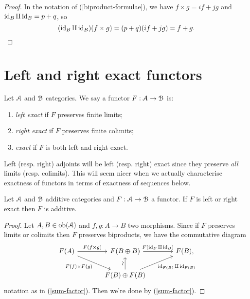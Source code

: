 \begin{proof}
  In the notation of (\ref{biproduct-formulae}), we have $f \times g =
  if + jg$ and $\operatorname{id}_B \amalg \operatorname{id}_B = p + q$, so
  \[
  (\operatorname{id}_B \amalg \operatorname{id}_B)(f \times g) = (p+q)(if+jg) = f+g. \qedhere
  \]
\end{proof}

\section{Left and right exact functors}

\begin{definition}
  \label{exactness}
  Let $\mathcal{A}$ and $\mathcal{B}$ categories. We say a functor $F : \mathcal{A} \to \mathcal{B}$ is:
  \begin{enumerate}
  \item \emph{left exact} if $F$ preserves finite limits;
  \item \emph{right exact} if $F$ preserves finite colimits;
  \item \emph{exact} if $F$ is both left and right exact.
  \end{enumerate}
\end{definition}

\begin{example}
  Left (resp. right) adjoints will be left (resp. right) exact since
  they preserve \emph{all} limits (resp. colimits). This will seem
  nicer when we actually characterise exactness of functors in terms
  of exactness of sequences below.
\end{example}

\begin{lemma}
  \label{exact-additive}
  Let $\mathcal{A}$ and $\mathcal{B}$ additive categories and $F : \mathcal{A} \to \mathcal{B}$ a
  functor. If $F$ is left or right exact then $F$ is additive.
\end{lemma}

\begin{proof}
  Let $A,B \in \operatorname{ob}(\mathcal{A})$ and $f,g : A \to B$ two morphisms. Since if
  $F$ preserves limits or colimits then $F$ preserves biproducts, we
  have the commutative diagram
  \[
  \begin{tikzcd}[column sep = large]
    F(A) \rar{F(f \times g)} \ar{dr}[swap]{F(f) \times F(g)} & F(B
    \oplus B) \rar{F(\id_B \amalg \id_B)} & F(B), \\ & F(B) \oplus
    F(B) \ar{u}[anchor=center,rotate=90,yshift=3pt]{\sim}
    \ar{ur}[swap]{\id_{F(B)} \amalg \id_{F(B)}} &
  \end{tikzcd}
  \]
  notation as in (\ref{sum-factor}). Then we're done by
  (\ref{sum-factor}).
\end{proof}

